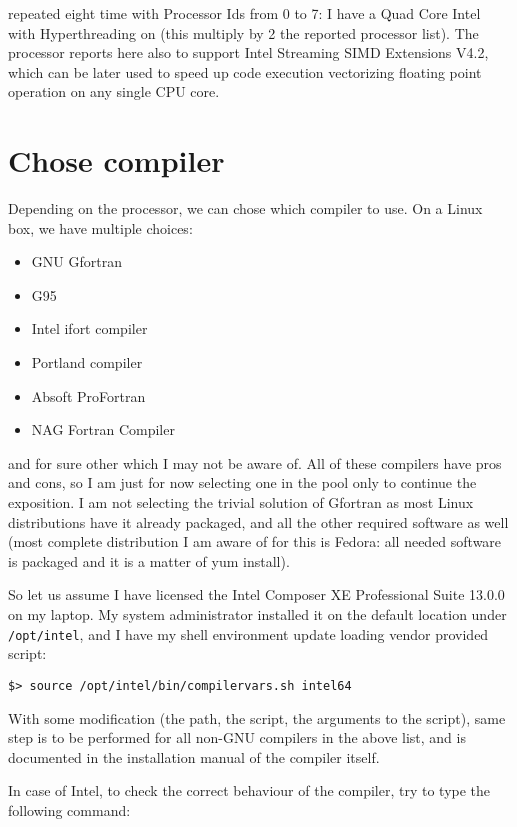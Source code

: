 repeated eight time with Processor Ids from 0 to 7: I have a Quad Core Intel
with Hyperthreading on (this multiply by 2 the reported processor list).
The processor reports here also to support Intel Streaming SIMD Extensions V4.2,
which can be later used to speed up code execution vectorizing floating point
operation on any single CPU core.

\section{Chose compiler}

Depending on the processor, we can chose which compiler to use. On a Linux box,
we have multiple choices:

\begin{itemize}
\item GNU Gfortran
\item G95
\item Intel ifort compiler
\item Portland compiler
\item Absoft ProFortran
\item NAG Fortran Compiler
\end{itemize}

and for sure other which I may not be aware of. All of these compilers have pros
and cons, so I am just for now selecting one in the pool only to continue the
exposition. I am not selecting the trivial solution of Gfortran as most
Linux distributions have it already packaged, and all the other required
software as well (most complete distribution I am aware of for this is Fedora:
all needed software is packaged and it is a matter of yum install).

So let us assume I have licensed the Intel Composer XE Professional Suite
13.0.0 on my laptop. My system administrator installed it on the default
location under \verb=/opt/intel=, and I have my shell environment update
loading vendor provided script:

\begin{Verbatim}
$> source /opt/intel/bin/compilervars.sh intel64
\end{Verbatim}

With some modification (the path, the script, the arguments to the script),
same step is to be performed for all non-GNU compilers in the above list, and
is documented in the installation manual of the compiler itself.

In case of Intel, to check the correct behaviour of the compiler, try to
type the following command:


